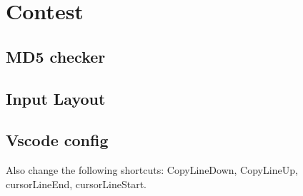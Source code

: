 \chapter{Contest}


\section{MD5 checker}

\section{Input Layout}

\section{Vscode config}
Also change the following shortcuts: CopyLineDown, CopyLineUp, cursorLineEnd, cursorLineStart.
    

